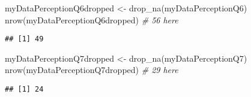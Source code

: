 \documentclass[
]{article}
\newenvironment{Shaded}{\begin{snugshade}}{\end{snugshade}}
\newcommand{\CommentTok}[1]{\textcolor[rgb]{0.56,0.35,0.01}{\textit{#1}}}
\newcommand{\FunctionTok}[1]{\textcolor[rgb]{0.00,0.00,0.00}{#1}}
\newcommand{\NormalTok}[1]{#1}
\newcommand{\OtherTok}[1]{\textcolor[rgb]{0.56,0.35,0.01}{#1}}
\begin{document}
\begin{Shaded}
\begin{Highlighting}[]
\NormalTok{myDataPerceptionQ6dropped }\OtherTok{\textless{}{-}} \FunctionTok{drop\_na}\NormalTok{(myDataPerceptionQ6)}
\FunctionTok{nrow}\NormalTok{(myDataPerceptionQ6dropped) }\CommentTok{\# 56 here}
\end{Highlighting}
\end{Shaded}

\begin{verbatim}
## [1] 49
\end{verbatim}

\begin{Shaded}
\begin{Highlighting}[]
\NormalTok{myDataPerceptionQ7dropped }\OtherTok{\textless{}{-}} \FunctionTok{drop\_na}\NormalTok{(myDataPerceptionQ7)}
\FunctionTok{nrow}\NormalTok{(myDataPerceptionQ7dropped) }\CommentTok{\# 29 here}
\end{Highlighting}
\end{Shaded}

\begin{verbatim}
## [1] 24
\end{verbatim}
\end{document}
